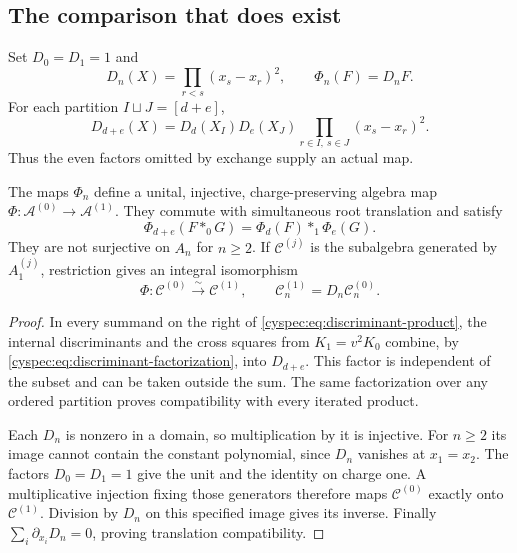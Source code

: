\subsection{The comparison that does exist}

Set $D_0=D_1=1$ and
\begin{equation}\label{cyspec:eq:discriminant}
 D_n(X)=\prod_{r<s}(x_s-x_r)^2,\qquad \Phi_n(F)=D_nF.
\end{equation}
For each partition $I\sqcup J=[d+e]$,
\begin{equation}\label{cyspec:eq:discriminant-factorization}
 D_{d+e}(X)=D_d(X_I)D_e(X_J)
                  \prod_{r\in I,\ s\in J}(x_s-x_r)^2.
\end{equation}
Thus the even factors omitted by exchange supply an actual map.

\begin{theorem}\label{cyspec:thm:discriminant-map}
The maps $\Phi_n$ define a unital, injective, charge-preserving
algebra map $\Phi:\mathcal A^{(0)}\to\mathcal A^{(1)}$.
They commute with simultaneous root translation and satisfy
\begin{equation}\label{cyspec:eq:discriminant-product}
 \Phi_{d+e}(F*_0G)=\Phi_d(F)*_1\Phi_e(G).
\end{equation}
They are not surjective on $A_n$ for $n\geq2$.
If $\mathcal C^{(j)}$ is the subalgebra generated by $A_1^{(j)}$,
restriction gives an integral isomorphism
\begin{equation}\label{cyspec:eq:current-isomorphism}
 \Phi:\mathcal C^{(0)}\xrightarrow{\sim}\mathcal C^{(1)},
 \qquad\mathcal C_n^{(1)}=D_n\mathcal C_n^{(0)}.
\end{equation}
\end{theorem}

\begin{proof}
In every summand on the right of
\eqref{cyspec:eq:discriminant-product}, the internal discriminants
and the cross squares from $K_1=v^2K_0$ combine, by
\eqref{cyspec:eq:discriminant-factorization}, into $D_{d+e}$.
This factor is independent of the subset and can be taken outside
the sum. The same factorization over any ordered partition proves
compatibility with every iterated product.

Each $D_n$ is nonzero in a domain, so multiplication by it is
injective. For $n\geq2$ its image cannot contain the constant
polynomial, since $D_n$ vanishes at $x_1=x_2$.
The factors $D_0=D_1=1$ give the unit and the identity on charge
one. A multiplicative injection fixing those generators therefore
maps $\mathcal C^{(0)}$ exactly onto $\mathcal C^{(1)}$.
Division by $D_n$ on this specified image gives its inverse.
Finally $\sum_i\partial_{x_i}D_n=0$, proving translation compatibility.
\end{proof}

